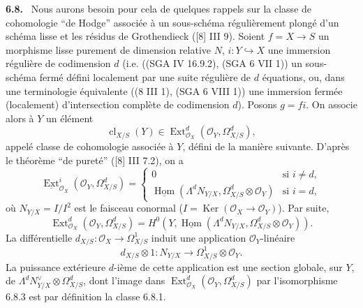 \documentclass[11pt]{article}
\providecommand{\uExt}{\underline{\Ext}}
\newenvironment{statement}[1]{\par\medskip\noindent\textbf{#1.}\ }{\par\medskip}
\DeclareMathOperator{\Hom}{Hom}
\DeclareMathOperator{\Ext}{Ext}
\providecommand{\Ker}{\operatorname{Ker}}
\providecommand{\cl}{\operatorname{cl}}
\providecommand{\OO}{\mathcal O}
\begin{document}
\begin{statement}{6.8}
Nous aurons besoin pour cela de quelques rappels sur la classe de cohomologie ``de Hodge'' associée à un sous-schéma régulièrement plongé d'un schéma lisse et les résidus de Grothendieck ([8] III 9). Soient $f=X\to S$ un morphisme lisse purement de dimension relative $N$, $i:Y\hookrightarrow X$ une immersion régulière de codimension $d$ (i.e. ((SGA IV 16.9.2), (SGA 6 VII 1)) un sous-schéma fermé défini localement par une suite régulière de $d$ équations, ou, dans une terminologie équivalente ((8 III 1), (SGA 6 VIII 1)) une immersion fermée (localement) d'intersection complète de codimension $d$). Posons $g=fi$. On associe alors à $Y$ un élément
\begin{equation}
\tag{6.8.1}
\cl_{X/S}(Y)\in\Ext^d_{\OO_X}(\OO_Y,\Omega^d_{X/S}),
\end{equation}
appelé classe de cohomologie associée à $Y$, défini de la manière suivante. D'après le théorème ``de pureté'' ([8] III 7.2), on a
\begin{equation}
\tag{6.8.2}
\uExt^i_{\OO_X}(\OO_Y,\Omega^d_{X/S})=
\begin{cases}
0 & \text{si } i\ne d,\\
\underline{\Hom}(\Lambda^dN_{Y/X},\Omega^d_{X/S}\otimes\OO_Y) & \text{si } i=d,
\end{cases}
\end{equation}
où $N_{Y/X}=I/I^2$ est le faisceau conormal ($I=\Ker(\OO_X\to\OO_Y)$). Par suite,
\begin{equation}
\tag{6.8.3}
\Ext^d_{\OO_X}(\OO_Y,\Omega^d_{X/S})=H^0(Y,\underline{\Hom}(\Lambda^dN_{Y/X},\Omega^d_{X/S}\otimes\OO_Y)).
\end{equation}
La différentielle $d_{X/S}:\OO_X\to\Omega^1_{X/S}$ induit une application $\OO_Y$-linéaire
\[
d_{X/S}\otimes 1:N_{Y/X}\longrightarrow \Omega^1_{X/S}\otimes\OO_Y.
\]
La puissance extérieure $d$-ième de cette application est une section globale, sur $Y$, de $\Lambda^dN^\vee_{Y/X}\otimes\Omega^d_{X/S}$, dont l'image dans $\Ext^d_{\OO_X}(\OO_Y,\Omega^d_{X/S})$ par l'isomorphisme 6.8.3 est par définition la classe 6.8.1.


\end{statement}
\end{document}
